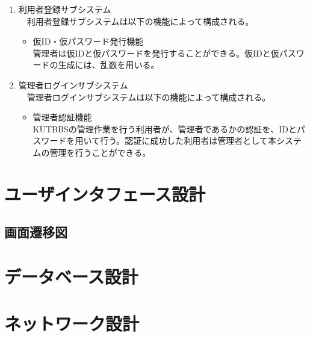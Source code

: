 \documentclass[a4j]{jarticle}
\begin{document}
\begin{enumerate}
  \item 利用者登録サブシステム\\
  　利用者登録サブシステムは以下の機能によって構成される。
  \begin{itemize}
    \item 仮ID・仮パスワード発行機能\\
    管理者は仮IDと仮パスワードを発行することができる。仮IDと仮パスワードの生成には、乱数を用いる。\\
  \end{itemize}


  \item 管理者ログインサブシステム\\
  　管理者ログインサブシステムは以下の機能によって構成される。
  \begin{itemize}
    \item 管理者認証機能\\
    KUTBBSの管理作業を行う利用者が、管理者であるかの認証を、IDとパスワードを用いて行う。認証に成功した利用者は管理者として本システムの管理を行うことができる。
  \end{itemize}

\end{enumerate}



\section{ユーザインタフェース設計}

\subsection{画面遷移図}


\section{データベース設計}


\section{ネットワーク設計}






\begin{thebibliography}{10}



\end{thebibliography}
\end{document}
